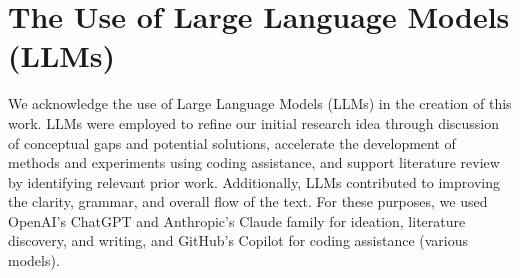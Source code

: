 \section{The Use of Large Language Models (LLMs)}

We acknowledge the use of Large Language Models (LLMs) in the creation of this work. LLMs were employed to refine our initial research idea through discussion of conceptual gaps and potential solutions, accelerate the development of methods and experiments using coding assistance, and support literature review by identifying relevant prior work. Additionally, LLMs contributed to improving the clarity, grammar, and overall flow of the text. For these purposes, we used OpenAI's ChatGPT and Anthropic's Claude family for ideation, literature discovery, and writing, and GitHub's Copilot for coding assistance (various models).
